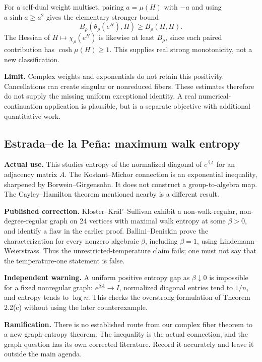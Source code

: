 For a self-dual weight multiset, pairing $a=\mu(H)$ with $-a$ and using $a\sinh a\ge a^2$ gives the elementary stronger bound
\[
B_\rho(\theta_\rho(e^H),H)\ge B_\rho(H,H).
\]
The Hessian of $H\mapsto\chi_\rho(e^H)$ is likewise at least $B_\rho$, since each paired contribution has $\cosh\mu(H)\ge1$. This supplies real strong monotonicity, not a new classification.

\textbf{Limit.} Complex weights and exponentials do not retain this positivity. Cancellations can create singular or nonreduced fibers. These estimates therefore do not supply the missing uniform exceptional identity. A real numerical-continuation application is plausible, but is a separate objective with additional quantitative work.

\subsection{Estrada--de la Pe\~na: maximum walk entropy}

\textbf{Actual use.} This studies entropy of the normalized diagonal of $e^{\beta A}$ for an adjacency matrix $A$. The Kostant--Michor connection is an exponential inequality, sharpened by Borwein--Girgensohn. It does not construct a group-to-algebra map. The Cayley--Hamilton theorem mentioned nearby is a different result.

\textbf{Published correction.} Kloster--Kr\'al'--Sullivan exhibit a non-walk-regular, non-degree-regular graph on 24 vertices with maximal walk entropy at some $\beta>0$, and identify a flaw in the earlier proof. Ballini--Deniskin prove the characterization for every nonzero algebraic $\beta$, including $\beta=1$, using Lindemann--Weierstrass. Thus the unrestricted-temperature claim fails; one must not say that the temperature-one statement is false.

\textbf{Independent warning.} A uniform positive entropy gap as $\beta\downarrow0$ is impossible for a fixed nonregular graph: $e^{\beta A}\to I$, normalized diagonal entries tend to $1/n$, and entropy tends to $\log n$. This checks the overstrong formulation of Theorem 2.2(c) without using the later counterexample.

\textbf{Ramification.} There is no established route from our complex fiber theorem to a new graph-entropy theorem. The inequality is the actual connection, and the graph question has its own corrected literature. Record it accurately and leave it outside the main agenda.

